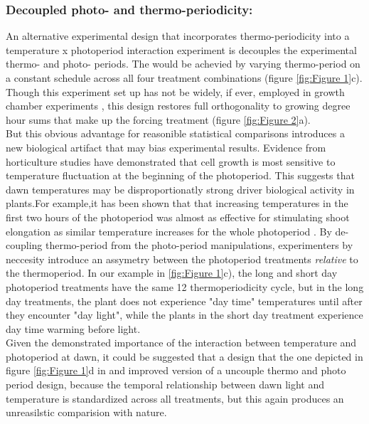 \documentclass[12pt]{article}\usepackage[]{graphicx}\usepackage[]{color}
\begin{document}
\subsubsection*{Decoupled photo- and thermo-periodicity:}
 \indent \indent An alternative experimental design that incorporates thermo-periodicity into a temperature x photoperiod interaction experiment is decouples the experimental thermo- and photo- periods. The would be achevied by varying thermo-period on a constant schedule across all four treatment combinations (figure \ref{fig:Figure 1}c). Though this experiment set up has not be widely, if ever, employed in growth chamber experiments \citep{Ettinger_inprep}, this design restores full orthogonality to growing degree hour sums that make up the forcing treatment (figure \ref{fig:Figure 2}a).\\
\indent But this obvious advantage for reasonible statistical comparisons introduces a new biological artifact that may bias experimental results. Evidence from horticulture studies have demonstrated that cell growth is most sensitive to temperature fluctuation at the beginning of the photoperiod\citep{Erwin1998}. This suggests that dawn temperatures may be disproportionatly strong driver biological activity in plants.For example,it has been shown that that increasing temperatures in the first two hours of the photoperiod was almost as effective for stimulating shoot elongation as similar temperature increases for the whole photoperiod \citep{Erwin1998}. By de-coupling thermo-period from the photo-period manipulations, experimenters by neccesity introduce an assymetry between the photoperiod treatments \textit{relative} to the thermoperiod. In our example in \ref{fig:Figure 1}c), the long and short day photoperiod treatments have the same 12 thermoperiodicity cycle, but in the long day treatments, the plant does not experience "day time" temperatures until after they encounter "day light", while the plants in the short day treatment experience day time warming before light.\\
\indent Given the demonstrated importance of the interaction between temperature and photoperiod at dawn, it could be suggested that a design that the one depicted in figure \ref{fig:Figure 1}d in and improved version of a uncouple thermo and photo period design, because the temporal relationship between dawn light and temperature is standardized across all treatments, but this again produces an unreasilstic comparision with nature.\\ %
\end{document}
